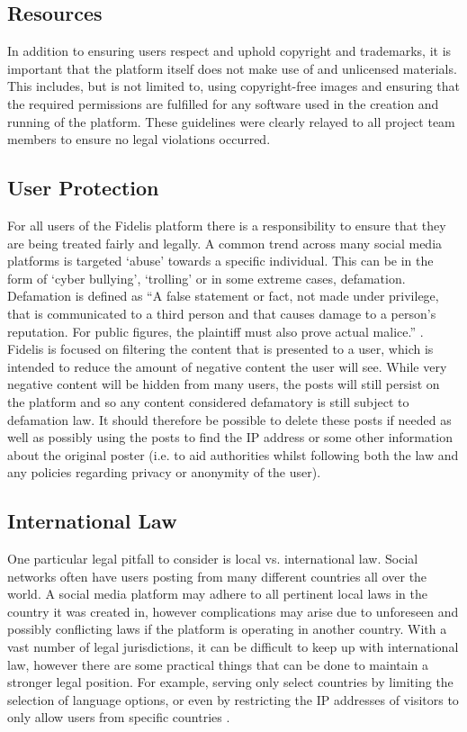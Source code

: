 \subsection{Resources}
In addition to ensuring users respect and uphold copyright and trademarks, it is important that the platform itself does not make use of and unlicensed materials. This includes, but is not limited to, using copyright-free images and ensuring that the required permissions are fulfilled for any software used in the creation and running of the platform. These guidelines were clearly relayed to all project team members to ensure no legal violations occurred.

\subsection{User Protection}
For all users of the Fidelis platform there is a responsibility to ensure that they are being treated fairly and legally. A common trend across many social media platforms is targeted `abuse' towards a specific individual. This can be in the form of `cyber bullying', `trolling’ or in some extreme cases, defamation. Defamation is defined as ``A false statement or fact, not made under privilege, that is communicated to a third person and that causes damage to a person’s reputation. For public figures, the plaintiff must also prove actual malice.'' \cite{BusinessLawToday}. Fidelis is focused on filtering the content that is presented to a user, which is intended to reduce the amount of negative content the user will see. While very negative content will be hidden from many users, the posts will still persist on the platform and so any content considered defamatory is still subject to defamation law. It should therefore be possible to delete these posts if needed as well as possibly using the posts to find the IP address or some other information about the original poster (i.e. to aid authorities whilst following both the law and any policies regarding privacy or anonymity of the user).

\subsection{International Law}
One particular legal pitfall to consider is local vs. international law. Social networks often have users posting from many different countries all over the world. A social media platform may adhere to all pertinent local laws in the country it was created in, however complications may arise due to unforeseen and possibly conflicting laws if the platform is operating in another country. With a vast number of legal jurisdictions, it can be difficult to keep up with international law, however there are some practical things that can be done to maintain a stronger legal position. For example, serving only select countries by limiting the selection of language options, or even by restricting the IP addresses of visitors to only allow users from specific countries \cite{Olswang}.

